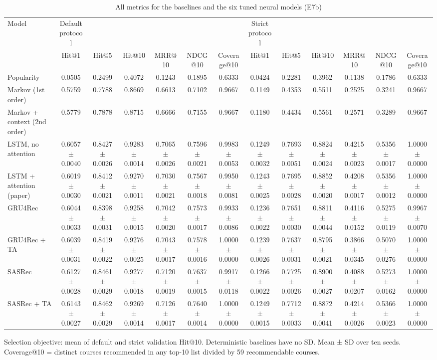 \begin{table}[t]\centering\footnotesize
\caption{All metrics for the baselines and the six tuned neural models (E7b)}
\begin{tabular}{lcccccccccccc}\toprule
Model & Default protocol &  &  &  &  &  & Strict protocol &  &  &  &  &  \\
 & Hit@1 & Hit@5 & Hit@10 & MRR@10 & NDCG@10 & Coverage@10 & Hit@1 & Hit@5 & Hit@10 & MRR@10 & NDCG@10 & Coverage@10 \\
\midrule
Popularity & 0.0505 & 0.2499 & 0.4072 & 0.1243 & 0.1895 & 0.6333 & 0.0424 & 0.2281 & 0.3962 & 0.1138 & 0.1786 & 0.6333 \\
Markov (1st order) & 0.5759 & 0.7788 & 0.8669 & 0.6613 & 0.7102 & 0.9667 & 0.1149 & 0.4353 & 0.5511 & 0.2525 & 0.3241 & 0.9667 \\
Markov + context (2nd order) & 0.5779 & 0.7878 & 0.8715 & 0.6666 & 0.7155 & 0.9667 & 0.1180 & 0.4434 & 0.5561 & 0.2571 & 0.3289 & 0.9667 \\
LSTM, no attention & 0.6057 $\pm$ 0.0040 & 0.8427 $\pm$ 0.0026 & 0.9283 $\pm$ 0.0014 & 0.7065 $\pm$ 0.0026 & 0.7596 $\pm$ 0.0021 & 0.9983 $\pm$ 0.0053 & 0.1249 $\pm$ 0.0032 & 0.7693 $\pm$ 0.0051 & 0.8824 $\pm$ 0.0024 & 0.4215 $\pm$ 0.0023 & 0.5356 $\pm$ 0.0017 & 1.0000 $\pm$ 0.0000 \\
LSTM + attention (paper) & 0.6019 $\pm$ 0.0030 & 0.8412 $\pm$ 0.0021 & 0.9270 $\pm$ 0.0011 & 0.7030 $\pm$ 0.0021 & 0.7567 $\pm$ 0.0018 & 0.9950 $\pm$ 0.0081 & 0.1243 $\pm$ 0.0025 & 0.7695 $\pm$ 0.0028 & 0.8852 $\pm$ 0.0020 & 0.4208 $\pm$ 0.0017 & 0.5356 $\pm$ 0.0012 & 1.0000 $\pm$ 0.0000 \\
GRU4Rec & 0.6044 $\pm$ 0.0033 & 0.8398 $\pm$ 0.0031 & 0.9258 $\pm$ 0.0015 & 0.7042 $\pm$ 0.0020 & 0.7573 $\pm$ 0.0017 & 0.9933 $\pm$ 0.0086 & 0.1236 $\pm$ 0.0022 & 0.7651 $\pm$ 0.0030 & 0.8811 $\pm$ 0.0044 & 0.4116 $\pm$ 0.0152 & 0.5275 $\pm$ 0.0119 & 0.9967 $\pm$ 0.0070 \\
GRU4Rec + TA & 0.6039 $\pm$ 0.0031 & 0.8419 $\pm$ 0.0022 & 0.9276 $\pm$ 0.0025 & 0.7043 $\pm$ 0.0017 & 0.7578 $\pm$ 0.0016 & 1.0000 $\pm$ 0.0000 & 0.1239 $\pm$ 0.0026 & 0.7637 $\pm$ 0.0031 & 0.8795 $\pm$ 0.0021 & 0.3866 $\pm$ 0.0345 & 0.5070 $\pm$ 0.0276 & 1.0000 $\pm$ 0.0000 \\
SASRec & 0.6127 $\pm$ 0.0028 & 0.8461 $\pm$ 0.0029 & 0.9277 $\pm$ 0.0018 & 0.7120 $\pm$ 0.0019 & 0.7637 $\pm$ 0.0015 & 0.9917 $\pm$ 0.0118 & 0.1266 $\pm$ 0.0022 & 0.7725 $\pm$ 0.0026 & 0.8900 $\pm$ 0.0027 & 0.4088 $\pm$ 0.0207 & 0.5273 $\pm$ 0.0162 & 1.0000 $\pm$ 0.0000 \\
SASRec + TA & 0.6143 $\pm$ 0.0027 & 0.8462 $\pm$ 0.0029 & 0.9269 $\pm$ 0.0014 & 0.7126 $\pm$ 0.0017 & 0.7640 $\pm$ 0.0014 & 1.0000 $\pm$ 0.0000 & 0.1249 $\pm$ 0.0015 & 0.7712 $\pm$ 0.0033 & 0.8872 $\pm$ 0.0041 & 0.4214 $\pm$ 0.0026 & 0.5366 $\pm$ 0.0023 & 1.0000 $\pm$ 0.0000 \\
\bottomrule
\end{tabular}
\par\smallskip\footnotesize Selection objective: mean of default and strict validation Hit@10. Deterministic baselines have no SD. Mean ± SD over ten seeds. Coverage@10 = distinct courses recommended in any top-10 list divided by 59 recommendable courses.
\end{table}